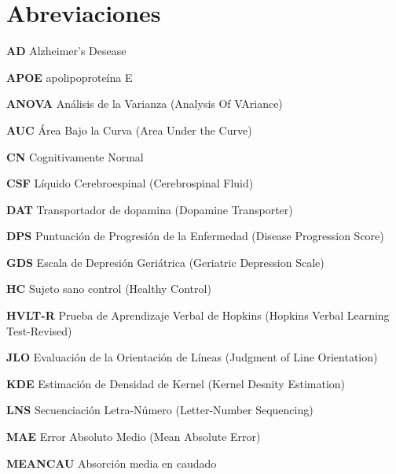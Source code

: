 \chapter{Abreviaciones}
\begin{description}
	\item \textbf{AD} Alzheimer’s Desease
	
	\item \textbf{APOE} apolipoproteína E
	
	\item \textbf{ANOVA} Análisis de la Varianza (Analysis Of VAriance)
	
	\item \textbf{AUC} Área Bajo la Curva (Area Under the Curve)
	
	\item \textbf{CN} Cognitivamente Normal
	
	\item \textbf{CSF} Líquido Cerebroespinal (Cerebrospinal Fluid)
	
	\item \textbf{DAT} Transportador de dopamina (Dopamine Transporter)
	
	\item \textbf{DPS} Puntuación de Progresión de la Enfermedad (Disease Progression Score)
	
	\item \textbf{GDS} Escala de Depresión Geriátrica (Geriatric Depression Scale)
	
	\item \textbf{HC} Sujeto sano control (Healthy Control)
	
	\item \textbf{HVLT-R} Prueba de Aprendizaje Verbal de Hopkins (Hopkins Verbal Learning
	Test-Revised)
	
	\item \textbf{JLO} Evaluación de la Orientación de Líneas (Judgment of Line Orientation)
	
	\item \textbf{KDE} Estimación de Densidad de Kernel (Kernel Desnity Estimation)
	
	\item \textbf{LNS} Secuenciación Letra-Número (Letter-Number Sequencing)
	
	\item \textbf{MAE} Error Absoluto Medio (Mean Absolute  Error)
	
	\item \textbf{MEANCAU} Absorción media en caudado
	

\end{description}
